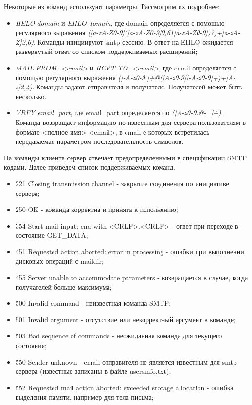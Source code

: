 \documentclass[a4paper,12pt]{report}
\begin{document}
Некоторые из команд используют параметры. Рассмотрим их подробнее:
\begin{itemize}
	\item \textit{HELO domain} и \textit{EHLO domain}, где domain определяется с помощью регулярного выражения \textit{([a-zA-Z0-9]([a-zA-Z0-9\-]{0,61}[a-zA-Z0-9])?\.)+[a-zA-Z]{2,6})}. Команды инициируют smtp-сессию. В ответ на EHLO ожидается развернутый ответ со списком поддерживаемых расширений;
	\item \textit{MAIL FROM: <email>} и \textit{RCPT TO: <email>}, где email определяется с помощью регулярного выражения \textit{([-A-z0-9.]+@([A-z0-9][-A-z0-9]+\.)+[A-z]{2,4})}. Команды задают отправителя и получателя. Получателей может быть несколько.
	\item \textit{VRFY email_part}, где email_part определяется по \textit{([A-z0-9.@-_]+)}. Команда возвращает информацию по известным для сервера пользователям в формате <полное имя> <email>, в email-е которых встретилась передаваемая параметром последовательность символов.
\end{itemize}

На команды клиента сервер отвечает предопределенными в спецификации SMTP кодами. Далее приведем список поддерживаемых команд.
\begin{itemize}
	\item 221 Closing transmission channel - закрытие соединения по инициативе сервера;
	\item 250 OK - команда корректна и принята к исполнению;
	\item 354 Start mail input; end with <CRLF>.<CRLF> - ответ при переходе в состояние GET_DATA;
	\item 451 Requested action aborted: error in processing - ошибки при выполнении дисковых операций с maildir;
	\item 455 Server unable to accommodate parameters - возвращается в случае, когда получателей больше максимума;
	\item 500 Invalid command - неизвестная команда SMTP;
	\item 501 Invalid argument - отсутствие или некорректный аргумент в команде;
	\item 503 Bad sequence of commands - неожиданная команда для текущего состояния;
	\item 550 Sender unknown - email отправителя не является известным для smtp-сервера (известные записаны в файле usersinfo.txt);
	\item 552 Requested mail action aborted: exceeded storage allocation - ошибка выделения памяти, например для тела письма;
\end{itemize}
\end{document}
